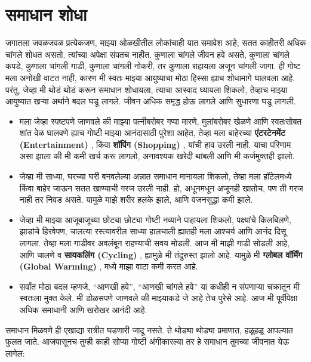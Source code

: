  \chapter{समाधान शोधा}
जगातला जवळजवळ प्रत्येकजण, माझ्या ओळखीतील लोकांचाही यात समावेश आहे, सतत काहीतरी अधिक चांगले शोधत असतो.
 त्यांच्या अपेक्षा संपतच नाहीत. कुणाला चांगले जीवन हवे असते, कुणाला चांगले कपडे, कुणाला चांगली गाडी, कुणाला चांगली नोकरी, तर कुणाला राहायला अजून चांगली जागा.
 ही गोष्ट मला अनोखी वाटत नाही, कारण मी स्वतः माझ्या आयुष्याचा मोठा हिस्सा ह्याच शोधामागे घालवला आहे.
परंतु, जेव्हा मी थोडं थोडं करून समाधान शोधायला, त्याचा आस्वाद घ्यायला शिकलो, तेव्हाच माझ्या आयुष्यात खऱ्या अर्थाने बदल घडू लागले.
 जीवन अधिक समृद्ध होऊ लागले आणि सुधारणा घडू लागली.
\begin{itemize}
 \item मला जेव्हा स्पष्टपणे जाणवले की माझ्या पत्नीबरोबर गप्पा मारणे, मुलांबरोबर खेळणे आणि स्वतःसोबत शांत वेळ घालवणे ह्याच गोष्टी माझ्या आनंदासाठी पुरेशा आहेत,
 तेव्हा मला बाहेरच्या \textbf{एंटरटेनमेंट (Entertainment)} , किंवा \textbf{शॉपिंग (Shopping)} , यांची हाव उरली नाही.
 याचा परिणाम असा झाला की मी कमी खर्च करू लागलो, अनावश्यक खरेदी थांबली आणि मी कर्जमुक्तही झालो.
\item जेव्हा मी साध्या, घरच्या घरी बनवलेल्या अन्नात समाधान मानायला शिकलो,
 तेव्हा मला हॉटेलमध्ये किंवा बाहेर जाऊन सतत खाण्याची गरज उरली नाही.
 हो, अधूनमधून अजूनही खातोच, पण ती गरज नाही तर निवड असते.
 यामुळे माझे शरीर हलके झाले, आणि वजनसुद्धा कमी झाले.
\item जेव्हा मी माझ्या आजूबाजूच्या छोट्या छोट्या गोष्टी नव्याने पाहायला शिकलो,
 पक्ष्यांचे किलबिलणे, झाडांचे हिरवेपण, चालत्या रस्त्यावरील साध्या हालचाली ह्यातही मला आश्चर्य आणि आनंद दिसू लागला.
 तेव्हा मला गाडीवर अवलंबून राहण्याची सवय मोडली.
 आज मी माझी गाडी सोडली आहे, आणि चालणे व \textbf{सायकलिंग (Cycling)} , ह्यामुळे मी तंदुरुस्त झालो आहे.
 यामुळे मी \textbf{ग्लोबल वॉर्मिंग (Global Warming)} , मध्ये माझा वाटा कमी करत आहे.
\item सर्वांत मोठा बदल म्हणजे, “आणखी हवे”, “आणखी चांगले हवे” या कधीही न संपणाऱ्या चक्रातून मी स्वतःला मुक्त केले.
 मी डोळसपणे जाणवले की माझ्याकडे जे आहे तेच पुरेसे आहे.
 आज मी पूर्वीपेक्षा अधिक समाधानी आणि खरोखर आनंदी आहे.
 \end{itemize}
समाधान मिळवणे ही एखाद्या रात्रीत घडणारी जादू नसते.
 ते थोड्या थोड्या प्रमाणात, हळूहळू आपल्यात फुलत जाते.
 आजपासूनच तुम्ही काही सोप्या गोष्टी अंगीकारल्या तर हे समाधान तुमच्या जीवनात येऊ लागेल:
